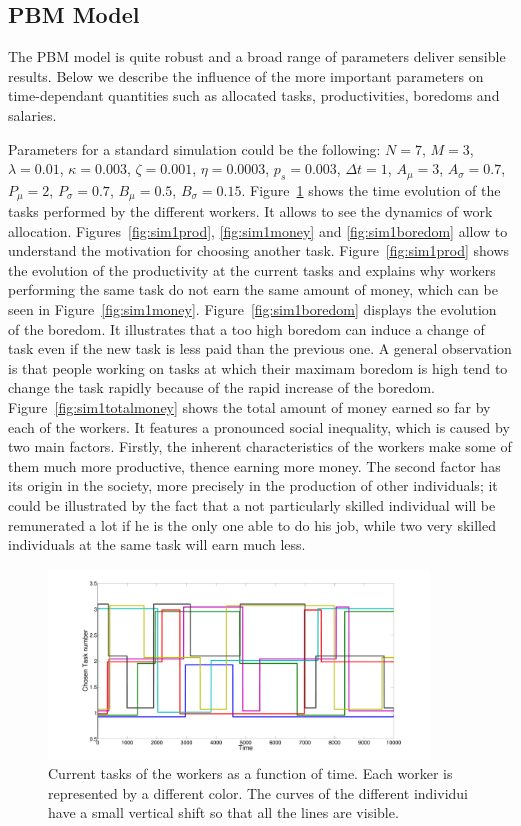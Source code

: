  

\subsection{PBM Model}
The PBM model is quite robust and a broad range of parameters deliver sensible results. Below we describe the influence of the more important parameters on time-dependant quantities such as allocated tasks, productivities, boredoms and salaries. 

Parameters for a standard simulation could be the following: $N=7$, $M=3$, $\lambda=0.01$, $\kappa=0.003$, $\zeta=0.001$, $\eta=0.0003$, $p_s=0.003$, $\Delta t=1$, $A_\mu=3$, $A_\sigma=0.7$, $P_\mu=2$, $P_\sigma=0.7$, $B_\mu=0.5$, $B_\sigma=0.15$. Figure~\ref{fig:sim1task} shows the time evolution of the tasks performed by the different workers. It allows to see the dynamics of work allocation. Figures~\ref{fig:sim1prod}, \ref{fig:sim1money} and \ref{fig:sim1boredom} allow to understand the motivation for choosing another task. Figure~\ref{fig:sim1prod} shows the evolution of the productivity at the current tasks and explains why workers performing the same task do not earn the same amount of money, which can be seen in Figure~\ref{fig:sim1money}. Figure~\ref{fig:sim1boredom} displays the evolution of the boredom. It illustrates that a too high boredom can induce a change of task even if the new task is less paid than the previous one. A general observation is that people working on tasks at which their maximam boredom is high tend to change the task rapidly because of the rapid increase of the boredom. Figure~\ref{fig:sim1totalmoney} shows the total amount of money earned so far by each of the workers. It features a pronounced social inequality, which is caused by two main factors. Firstly, the inherent characteristics of the workers make some of them much more productive, thence earning more money. The second factor has its origin in the society, more precisely in the production of other individuals; it could be illustrated by the fact that a not particularly skilled individual will be remunerated a lot if he is the only one able to do his job, while two very skilled individuals at the same task will earn much less.

\begin{figure}[hp!]
	\centering
	\includegraphics[width=0.9\textwidth]{figures/taskno.pdf}
	\caption{Current tasks of the workers as a function of time. Each worker is represented by a different color. The curves of the different individui have a small vertical shift so that all the lines are visible.}
	\label{fig:sim1task}
\end{figure}

